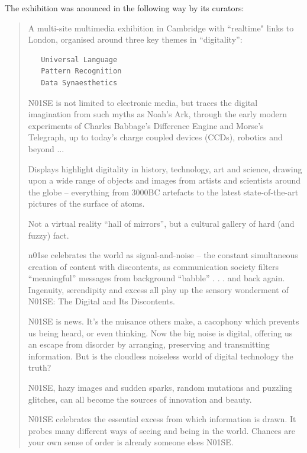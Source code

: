 The exhibition was anounced in the following way by its curators: 
\begin{quotation}
A multi-site multimedia exhibition in Cambridge with ``realtime" links to London, organised around three key themes in ``digitality'':

\begin{verbatim}
   Universal Language 
   Pattern Recognition 
   Data Synaesthetics
\end{verbatim} 

N01SE is not limited to electronic media, but traces the digital imagination from such myths as Noah's Ark, through the early modern experiments of Charles Babbage's Difference Engine and Morse's Telegraph, up to today's charge coupled devices (CCDs), robotics and beyond ...

Displays highlight digitality in history, technology, art and science, drawing upon a wide range of objects and images from artists and scientists around the globe -- everything from 3000BC artefacts to the latest state-of-the-art pictures of the surface of atoms. 

Not a virtual reality ``hall of mirrors'', but a cultural gallery of hard (and fuzzy) fact.

n01se celebrates the world as signal-and-noise -- the constant simultaneous creation of content with discontents, as communication society filters ``meaningful'' messages from background ``babble'' . . . and back again. Ingenuity, serendipity and excess all play up the sensory wonderment of N01SE: The Digital and Its Discontents.

N01SE is news. It's the nuisance others make, a cacophony which prevents us being heard, or even thinking. 
Now the big noise is digital, offering us an escape from disorder by arranging, preserving and transmitting 
information. But is the cloudless noiseless world of digital technology the truth? 

N01SE, hazy images and sudden sparks, random mutations and puzzling glitches, can all become the sources of innovation 
and beauty. 

N01SE celebrates the essential excess from which information is drawn. It probes many different ways of seeing and 
being in the world. Chances are your own sense of order is already someone elses N01SE.
\end{quotation}

